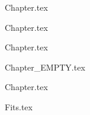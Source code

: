 \documentclass{ThesisStyle}
\begin{document}



\frontmatter
{}

%

%

%



\renewcommand{\contentsname}{Table of Contents}
\tableofcontents
{}
\clearemptydoublepage



\mainmatter

\begin{linenumbers}

{Chapter.tex}
\clearemptydoublepage

{Chapter.tex}
\clearemptydoublepage

{Chapter.tex}
\clearemptydoublepage

{Chapter_EMPTY.tex}
\clearemptydoublepage

{Chapter.tex}

\end{linenumbers}



\appendix


{Fits.tex}
\clearemptydoublepage


\end{document}
